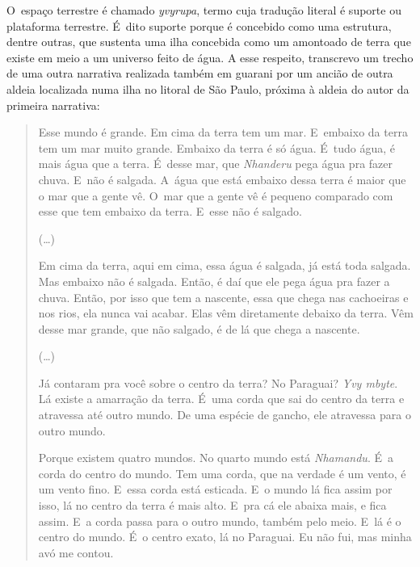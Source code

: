 O~espaço terrestre é chamado \emph{yvyrupa}, termo cuja tradução literal é
suporte ou plataforma terrestre. É~dito suporte porque é concebido como
uma estrutura, dentre outras, que sustenta uma ilha concebida como um
amontoado de terra que existe em meio a um universo feito de água. A
esse respeito, transcrevo um trecho de uma outra narrativa realizada
também em guarani por um ancião de outra aldeia localizada numa ilha no
litoral de São Paulo, próxima à aldeia do autor da primeira narrativa:

\begin{quote}
\noindent
Esse mundo é grande. Em cima da terra tem um mar. E~embaixo da terra tem
um mar muito grande. Embaixo da terra é só água. É~tudo água, é mais
água que a terra. É~desse mar, que \emph{Nhanderu} pega água pra fazer chuva.
E~não é salgada. A~água que está embaixo dessa terra é maior que o mar
que a gente vê. O~mar que a gente vê é pequeno comparado com esse que
tem embaixo da terra. E~esse não é salgado.

\medskip

\noindent
(\ldots{})

\medskip

\noindent
Em cima da terra, aqui em cima, essa água é salgada, já está toda
salgada. Mas embaixo não é salgada. Então, é daí que ele pega água pra
fazer a chuva. Então, por isso que tem a nascente, essa que chega nas
cachoeiras e nos rios, ela nunca vai acabar. Elas vêm diretamente
debaixo da terra. Vêm desse mar grande, que não salgado, é de lá que
chega a nascente.

\medskip

\noindent
(\ldots{}) 

\medskip

\noindent
Já contaram pra você sobre o centro da terra? No Paraguai? \emph{Yvy mbyte}. Lá
existe a amarração da terra. É~uma corda que sai do centro da terra e
atravessa até outro mundo. De uma espécie de gancho, ele atravessa para
o outro mundo.

\noindent
Porque existem quatro mundos. No quarto mundo está \emph{Nhamandu}. É~a corda
do centro do mundo. Tem uma corda, que na verdade é um vento, é um
vento fino. E~essa corda está esticada. E~o mundo lá fica assim por
isso, lá no centro da terra é mais alto. E~pra cá ele abaixa mais, e
fica assim. E~a corda passa para o outro mundo, também pelo meio. E~lá
é o centro do mundo. É~o centro exato, lá no Paraguai. Eu não fui, mas
minha avó me contou.
\end{quote}

